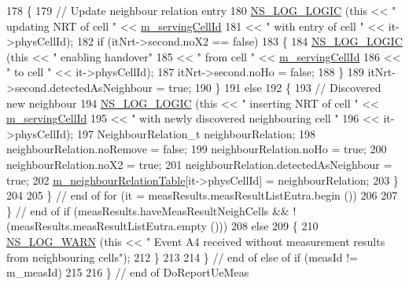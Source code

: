\begin{DoxyCode}
178                 \{
179                   \textcolor{comment}{// Update neighbour relation entry}
180                   \hyperlink{group__logging_ga88acd260151caf2db9c0fc84997f45ce}{NS\_LOG\_LOGIC} (\textcolor{keyword}{this} << \textcolor{stringliteral}{" updating NRT of cell "} << 
      \hyperlink{classns3_1_1LteAnr_a9a2e5aef479439b1f909f46f260f7092}{m\_servingCellId}
181                                      << \textcolor{stringliteral}{" with entry of cell "} << it->physCellId);
182                   \textcolor{keywordflow}{if} (itNrt->second.noX2 == \textcolor{keyword}{false})
183                     \{
184                       \hyperlink{group__logging_ga88acd260151caf2db9c0fc84997f45ce}{NS\_LOG\_LOGIC} (\textcolor{keyword}{this} << \textcolor{stringliteral}{" enabling handover"}
185                                          << \textcolor{stringliteral}{" from cell "} << \hyperlink{classns3_1_1LteAnr_a9a2e5aef479439b1f909f46f260f7092}{m\_servingCellId}
186                                          << \textcolor{stringliteral}{" to cell "} << it->physCellId);
187                       itNrt->second.noHo = \textcolor{keyword}{false};
188                     \}
189                   itNrt->second.detectedAsNeighbour = \textcolor{keyword}{true};
190                 \}
191               \textcolor{keywordflow}{else}
192                 \{
193                   \textcolor{comment}{// Discovered new neighbour}
194                   \hyperlink{group__logging_ga88acd260151caf2db9c0fc84997f45ce}{NS\_LOG\_LOGIC} (\textcolor{keyword}{this} << \textcolor{stringliteral}{" inserting NRT of cell "} << 
      \hyperlink{classns3_1_1LteAnr_a9a2e5aef479439b1f909f46f260f7092}{m\_servingCellId}
195                                      << \textcolor{stringliteral}{" with newly discovered neighbouring cell "}
196                                      << it->physCellId);
197                   NeighbourRelation\_t neighbourRelation;
198                   neighbourRelation.noRemove = \textcolor{keyword}{false};
199                   neighbourRelation.noHo = \textcolor{keyword}{true};
200                   neighbourRelation.noX2 = \textcolor{keyword}{true};
201                   neighbourRelation.detectedAsNeighbour = \textcolor{keyword}{true};
202                   \hyperlink{classns3_1_1LteAnr_a90fc8417020463e795dc960f2f53bc24}{m\_neighbourRelationTable}[it->physCellId] = neighbourRelation;
203                 \}
204 
205             \} \textcolor{comment}{// end of for (it = measResults.measResultListEutra.begin ())}
206 
207         \} \textcolor{comment}{// end of if (measResults.haveMeasResultNeighCells && !(measResults.measResultListEutra.empty
       ()))}
208       \textcolor{keywordflow}{else}
209         \{
210           \hyperlink{group__logging_gade7208b4009cdf0e25783cd26766f559}{NS\_LOG\_WARN} (\textcolor{keyword}{this} << \textcolor{stringliteral}{" Event A4 received without measurement results from neighbouring
       cells"});
212         \}
213 
214     \} \textcolor{comment}{// end of else of if (measId != m\_measId)}
215 
216 \} \textcolor{comment}{// end of DoReportUeMeas}
\end{DoxyCode}
